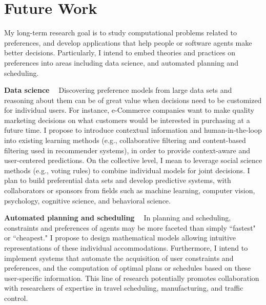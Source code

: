 \section{Future Work}
My long-term research goal is to study computational problems related to preferences, and 
develop applications that help people or software agents make better decisions.
Particularly, I intend to embed theories and practices on preferences into areas including
data science, and automated planning and scheduling.

\smallskip \noindent \textbf{Data science \  } Discovering preference 
models from large data sets and reasoning about them 
can be of great value when decisions need to be customized for individual users.
For instance, e-Commerce companies want to make quality marketing decisions
on what customers would be interested in purchasing at a future time.
I propose to introduce contextual information and human-in-the-loop into existing learning methods
(e.g., collaborative filtering and content-based filtering used in recommender systems), 
in order to provide context-aware and user-centered predictions.
On the collective level, I mean to leverage social science methods (e.g., voting rules)
to combine individual models for joint decisions.
I plan to build preferential data sets and develop predictive systems, with collaborators
or sponsors from fields 
such as machine learning, computer vision, psychology, cognitive science, and behavioral science.

\smallskip \noindent \textbf{Automated planning and scheduling \  }
In planning and scheduling, constraints and preferences of agents may be more faceted than simply
``fastest" or ``cheapest."
I propose to design mathematical models allowing
intuitive representations of these individual accommodations. 
Furthermore, I intend to implement systems
that automate the acquisition of user constraints and preferences, 
and the computation of optimal plans or schedules 
based on these user-specific information.
This line of research potentially promotes collaboration with researchers of expertise in
travel scheduling, manufacturing, and traffic control.
